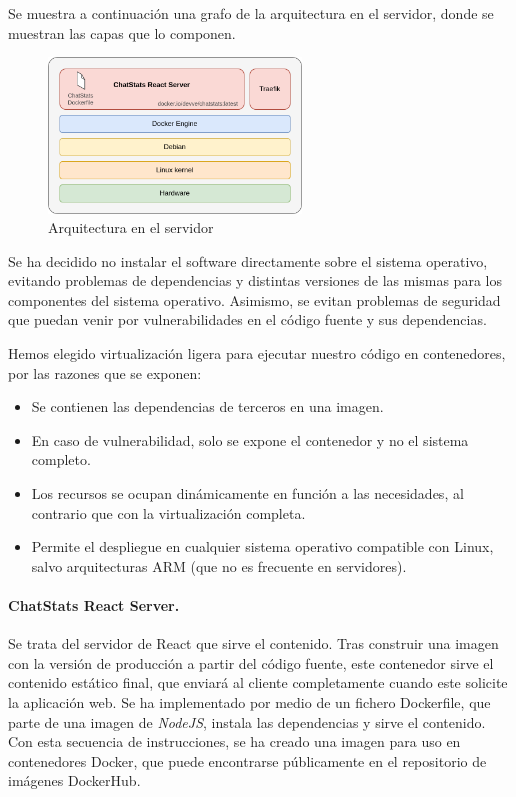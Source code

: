 Se muestra a continuación una grafo de la arquitectura en el servidor, donde se muestran las capas que lo componen.

\begin{figure}[H]
	\centering
	\includegraphics[width=0.6\textwidth]{img/server.png}
	\caption{Arquitectura en el servidor}
	\label{fig:chap4:architecture_server}
\end{figure}

Se ha decidido no instalar el software directamente sobre el sistema operativo, evitando problemas de dependencias y distintas versiones de las mismas para los componentes del sistema operativo. Asimismo, se evitan problemas de seguridad que puedan venir por vulnerabilidades en el código fuente y sus dependencias.

Hemos elegido virtualización ligera para ejecutar nuestro código en contenedores, por las razones que se exponen:

\begin{itemize}
	\item Se contienen las dependencias de terceros en una imagen.
	\item En caso de vulnerabilidad, solo se expone el contenedor y no el sistema completo.
	\item Los recursos se ocupan dinámicamente en función a las necesidades, al contrario que con la virtualización completa.
	\item Permite el despliegue en cualquier sistema operativo compatible con Linux, salvo arquitecturas ARM (que no es frecuente en servidores).
\end{itemize}

\paragraph{ChatStats React Server.} Se trata del servidor de React que sirve el contenido. Tras construir una imagen con la versión de producción a partir del código fuente, este contenedor sirve el contenido estático final, que enviará al cliente completamente cuando este solicite la aplicación web. Se ha implementado por medio de un fichero Dockerfile, que parte de una imagen de \textit{NodeJS}, instala las dependencias y sirve el contenido. Con esta secuencia de instrucciones, se ha creado una imagen para uso en contenedores Docker, que puede encontrarse públicamente en el repositorio de imágenes DockerHub.

